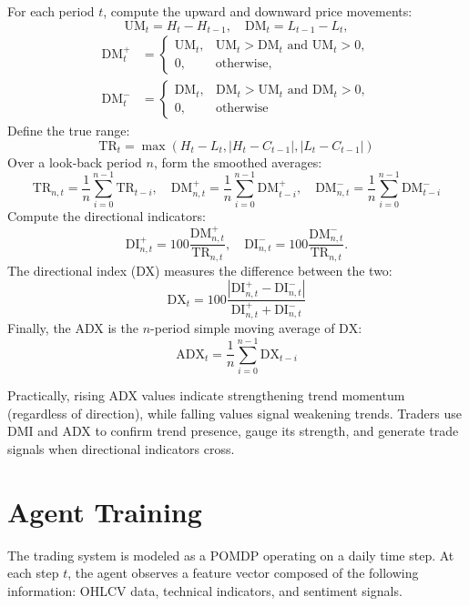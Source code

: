 For each period \(t\), compute the upward and downward price movements:
\[\mathrm{UM}_t = H_t - H_{t-1}, \quad \mathrm{DM}_t = L_{t-1} - L_t,\]
\[
\begin{aligned}
\mathrm{DM}^+_t &= 
  \begin{cases}
    \mathrm{UM}_t, & \mathrm{UM}_t > \mathrm{DM}_t \text{ and } \mathrm{UM}_t > 0,\\
    0, & \text{otherwise},
  \end{cases}
  \\
\mathrm{DM}^-_t &= 
  \begin{cases}
    \mathrm{DM}_t, & \mathrm{DM}_t > \mathrm{UM}_t \text{ and } \mathrm{DM}_t > 0,\\
    0, & \text{otherwise}
  \end{cases}
\end{aligned}
\]
Define the true range:
\[\mathrm{TR}_t = \max(H_t - L_t, |H_t - C_{t-1}|, |L_t - C_{t-1}|)\]
Over a look‐back period \(n\), form the smoothed averages:
\[\mathrm{TR}_{n,t} = \frac{1}{n} \sum_{i=0}^{n-1} \mathrm{TR}_{t-i}, \quad \mathrm{DM}^+_{n,t} = \frac{1}{n} \sum_{i=0}^{n-1}\mathrm{DM}^+_{t-i}, \quad \mathrm{DM}^-_{n,t} = \frac{1}{n} \sum_{i=0}^{n-1} \mathrm{DM}^-_{t-i}\]
Compute the directional indicators:
\[\mathrm{DI}^+_{n,t} =100 \frac{\mathrm{DM}^+_{n,t}}{\mathrm{TR}_{n,t}}, \quad \mathrm{DI}^-_{n,t} = 100 \frac{\mathrm{DM}^-_{n,t}}{\mathrm{TR}_{n,t}}.\]
The directional index (DX) measures the difference between the two:
\[\mathrm{DX}_t = 100 \frac{|\mathrm{DI}^+_{n,t} - \mathrm{DI}^-_{n,t}|}{\mathrm{DI}^+_{n,t} + \mathrm{DI}^-_{n,t}}\]
Finally, the \gls{ADX} is the \(n\)-period simple moving average of \(\mathrm{DX}\):
\[\mathrm{ADX}_t = \frac{1}{n} \sum_{i=0}^{n-1} \mathrm{DX}_{t-i}\]

Practically, rising \gls{ADX} values indicate strengthening trend momentum (regardless of direction), while falling values signal weakening trends. Traders use \gls{DMI} and \gls{ADX} to confirm trend presence, gauge its strength, and generate trade signals when directional indicators cross.

\section{Agent Training}
The trading system is modeled as a \gls{POMDP} operating on a daily time step. At each step \(t\), the agent observes a feature vector composed of the following information: \gls{OHLCV} data, technical indicators, and sentiment signals. 

